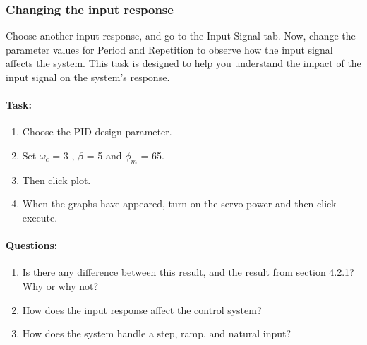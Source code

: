 \subsubsection{Changing the input response }
Choose another input response, and go to the Input Signal tab. Now, change the parameter values for Period and Repetition to observe how the input signal affects the system. This task is designed to help you understand the impact of the input signal on the system’s response.

\paragraph{Task:}
\begin{enumerate}[]
	\item Choose the PID design parameter. 
	\item Set $\omega_c$ = 3 , $\beta$ = 5 and $\phi_m$ = 65.
	\item Then click plot.
	\item When the graphs have appeared, turn on the servo power and then click execute.
\end{enumerate}
\paragraph{Questions:}
\begin{enumerate}[]
	\item Is there any difference between this result, and the result from section 4.2.1? Why or why not?
	\item How does the input response affect the control system?
	\item How does the system handle a step, ramp, and natural input?
\end{enumerate}


\newpage
